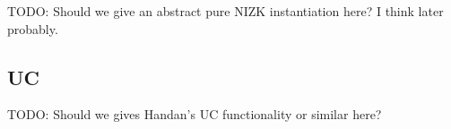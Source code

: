 TODO:  Should we give an abstract pure NIZK instantiation here?  I think later probably.


\subsection{UC}

TODO: Should we gives Handan's UC functionality or similar here? 




\endinput





















\begin{definition}
We say \rVRF satisfies {\em ring unforgeability} if
any PPT adversary $\adv$ has an advantage only
 negligible in $\secparam$ to win the game:
\begin{itemize}
\item[]
 Assume a set $\ctx_0 = \{ \pk_1,\ldots,\pk_n \}$ of public keys from
 distinct key pairs $(\pk_i,\sk_i) \leftarrow \KeyGen$ for $i=1,\ldots,n$ with $n \ge 2$.
 $\adv$ has signing oracles
 $\ora{Sign} : (i,\ctx',\msg',\aux') \mapsto
  \rSign(\sk_i,\CommitKey(\pk_i,\ctx').1,\msg',\aux')$
 for each secret key $\sk_i$ with $i=1,\ldots,n$, and
  their choice of $\ctx',\msg',\aux'$ with $\pk_i \in \ctx'$.
 Now $\adv$ wins by outputting a valid signature $\sigma$ for
 a ring $\ctx \subset \ctx_0$, a message \msg, and associated data \aux
 such that
 $\adv$ never invoked $\ora{Sign}$ on $\msg,\aux$ and $i$ with $\pk_i \in \ctx$.
\end{itemize}
\end{definition}

We also need a uniqueness condition that limits even adversaries who know the secret key.


